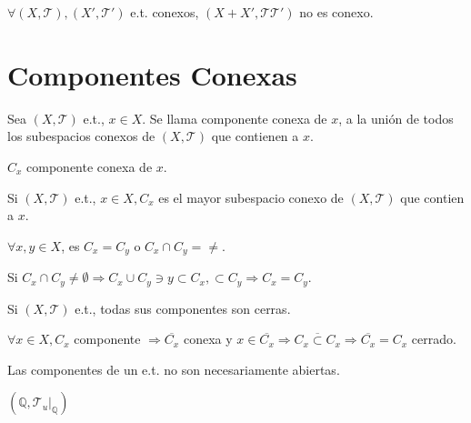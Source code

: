 \begin{obs}
  $\forall ( X, \mathcal{T} ), ( X', \mathcal{T}' )$ e.t. conexos, $( X + X', \mathcal{T} \mathcal{T}' )$ no es conexo.
\end{obs}

\section{Componentes Conexas}

\begin{defn}
  Sea $( X, \mathcal{T} )$ e.t., $x \in X$. Se llama componente conexa de $x$, a la unión de todos los subespacios conexos de $( X, \mathcal{T} )$ que contienen a $x$.
\end{defn}

\begin{nota}
  $C_{x}$ componente conexa de $x$.
\end{nota}

\begin{obs}
  Si $( X, \mathcal{T} )$ e.t., $x \in X, C_{x}$ es el mayor subespacio conexo de $( X, \mathcal{T} )$ que contien a $x$.
\end{obs}

\begin{obs}
  $\forall x, y \in X$, es $C_{x} = C_{y}$ o $C_{x} \cap C_{y} = \neq$.
\end{obs}

\begin{dem}
  Si $C_{x} \cap C_{y} \neq \emptyset \Rightarrow C_{x} \cup C_{y} \ni y \subset C_{x}, \subset C_{y} \Rightarrow C_{x} = C_{y}$.
\end{dem}

\begin{prop}
  Si $( X, \mathcal{T} )$ e.t., todas sus componentes son cerras.
\end{prop}

\begin{dem}
  $\forall x \in X, C_{x}$ componente $\Rightarrow \overline{C_{x}}$ conexa y $x \in \overline{C_{x}} \Rightarrow \overline{C_{x} \subset C_{x}} \Rightarrow \overline{C_{x}} = C_{x}$ cerrado.
\end{dem}

\begin{obs}
  Las componentes de un e.t. no son necesariamente abiertas.
\end{obs}

\begin{ejm}
  $( \mathbb{Q}, \mathcal{T}_{u}|_{\mathbb{Q}})$
\end{ejm}

